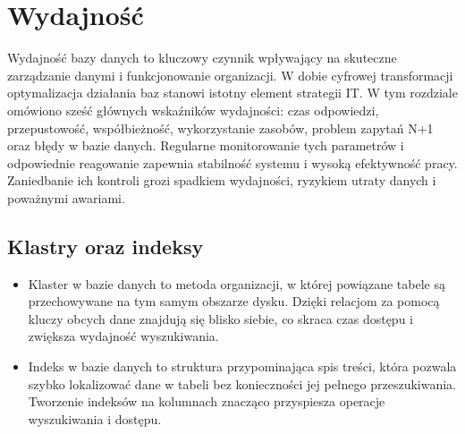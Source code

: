 \documentclass[a4paper,11pt,polish]{sphinxmanual}
\begin{document}
\section{Wydajność}
\label{\detokenize{Wydajnosc-Skalowanie-i-Replikacja/index:wydajnosc}}
\sphinxAtStartPar
Wydajność bazy danych to kluczowy czynnik wpływający na skuteczne zarządzanie danymi i funkcjonowanie organizacji. W dobie cyfrowej transformacji optymalizacja działania baz stanowi istotny element strategii IT. W tym rozdziale omówiono sześć głównych wskaźników wydajności: czas odpowiedzi, przepustowość, współbieżność, wykorzystanie zasobów, problem zapytań N+1 oraz błędy w bazie danych. Regularne monitorowanie tych parametrów i odpowiednie reagowanie zapewnia stabilność systemu i wysoką efektywność pracy. Zaniedbanie ich kontroli grozi spadkiem wydajności, ryzykiem utraty danych i poważnymi awariami.


\subsection{Klastry oraz indeksy}
\label{\detokenize{Wydajnosc-Skalowanie-i-Replikacja/index:klastry-oraz-indeksy}}\begin{itemize}
\item {} 
\sphinxAtStartPar
Klaster w bazie danych to metoda organizacji, w której powiązane tabele są przechowywane na tym samym obszarze dysku. Dzięki relacjom za pomocą kluczy obcych dane znajdują się blisko siebie, co skraca czas dostępu i zwiększa wydajność wyszukiwania.

\item {} 
\sphinxAtStartPar
Indeks w bazie danych to struktura przypominająca spis treści, która pozwala szybko lokalizować dane w tabeli bez konieczności jej pełnego przeszukiwania. Tworzenie indeksów na kolumnach znacząco przyspiesza operacje wyszukiwania i dostępu.

\end{itemize}
\end{document}
